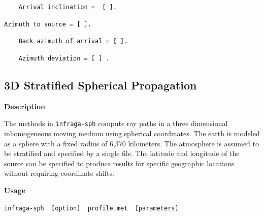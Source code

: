 \documentclass[10pt]{article}
\begin{document}
 	\hspace{24pt} \verb#	Arrival inclination =  [ ]. #

	\hspace{30pt} \verb#Azimuth to source = [ ].#

	\hspace{25pt} \verb#	Back azimuth of arrival = [ ].#
	
	\hspace{25pt} \verb#	Azimuth deviation = [ ] .#

\subsection{3D Stratified Spherical Propagation}
\label{Sect:Usage:Sph}
\textbf{Description}  

The methods in \verb=infraga-sph= compute ray paths in a three dimensional inhomogeneous moving medium using spherical coordinates.  The earth is modeled as a sphere with a fixed radius of 6,370 kilometers.  The atmosphere is assumed to be stratified and specified by a single file.  The latitude and longitude of the source can be specified to produce results for specific geographic locations without requiring coordinate shifts.

\vspace{0.02\textheight}

 \hspace{-0.25in}\textbf{Usage} 

\begin{center} \begin{large}
\verb=infraga-sph  [option]  profile.met  [parameters]=
\end{large} \end{center}
\end{document}
